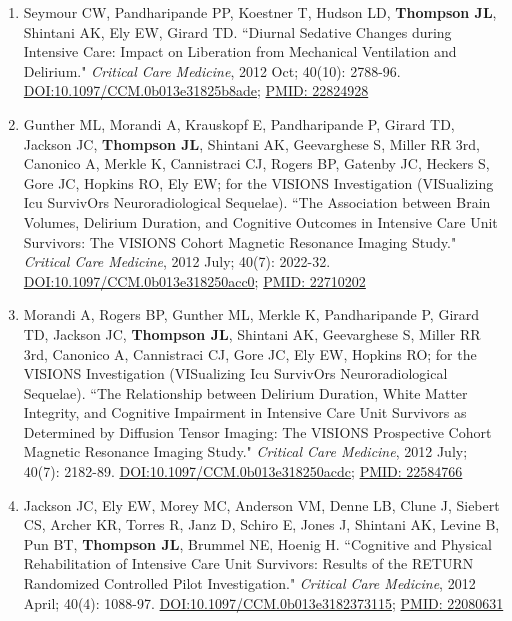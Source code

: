 \documentclass[5pt]{article}
\begin{document}
\begin{enumerate}
\item Seymour CW, Pandharipande PP, Koestner T, Hudson LD, \textbf{Thompson JL}, Shintani AK, Ely EW, Girard TD. ``Diurnal Sedative Changes during Intensive Care: Impact on Liberation from Mechanical Ventilation and Delirium." \emph{Critical Care Medicine}, 2012 Oct; 40(10): 2788-96.\\ \href{https://doi.org/10.1097/CCM.0b013e31825b8ade}{DOI:10.1097/CCM.0b013e31825b8ade}; \href{https://www.ncbi.nlm.nih.gov/pubmed/22824928}{PMID: 22824928}
\item Gunther ML, Morandi A, Krauskopf E, Pandharipande P, Girard TD, Jackson JC, \textbf{Thompson JL}, Shintani AK, Geevarghese S, Miller RR 3rd, Canonico A, Merkle K, Cannistraci CJ, Rogers BP, Gatenby JC, Heckers S, Gore JC, Hopkins RO, Ely EW; for the VISIONS Investigation (VISualizing Icu SurvivOrs Neuroradiological Sequelae). ``The Association between Brain Volumes, Delirium Duration, and Cognitive Outcomes in Intensive Care Unit Survivors: The VISIONS Cohort Magnetic Resonance Imaging Study." \emph{Critical Care Medicine}, 2012 July; 40(7): 2022-32. \href{https://doi.org/10.1097/CCM.0b013e318250acc0}{DOI:10.1097/CCM.0b013e318250acc0}; \href{https://www.ncbi.nlm.nih.gov/pubmed/22710202}{PMID: 22710202}
\item Morandi A, Rogers BP, Gunther ML, Merkle K, Pandharipande P, Girard TD, Jackson JC, \textbf{Thompson JL}, Shintani AK, Geevarghese S, Miller RR 3rd, Canonico A, Cannistraci CJ, Gore JC, Ely EW, Hopkins RO; for the VISIONS Investigation (VISualizing Icu SurvivOrs Neuroradiological Sequelae). ``The Relationship between Delirium Duration, White Matter Integrity, and Cognitive Impairment in Intensive Care Unit Survivors as Determined by Diffusion Tensor Imaging: The VISIONS Prospective Cohort Magnetic Resonance Imaging Study." \emph{Critical Care Medicine}, 2012 July; 40(7): 2182-89. \href{https://doi.org/10.1097/CCM.0b013e318250acdc}{DOI:10.1097/CCM.0b013e318250acdc}; \href{https://www.ncbi.nlm.nih.gov/pubmed/22584766}{PMID: 22584766}
\item Jackson JC, Ely EW, Morey MC, Anderson VM, Denne LB, Clune J, Siebert CS, Archer KR, Torres R, Janz D, Schiro E, Jones J, Shintani AK, Levine B, Pun BT, \textbf{Thompson JL}, Brummel NE, Hoenig H. ``Cognitive and Physical Rehabilitation of Intensive Care Unit Survivors: Results of the RETURN Randomized Controlled Pilot Investigation." \emph{Critical Care Medicine}, 2012 April; 40(4): 1088-97. \href{https://doi.org/10.1097/CCM.0b013e3182373115}{DOI:10.1097/CCM.0b013e3182373115}; \href{https://www.ncbi.nlm.nih.gov/pubmed/22080631}{PMID: 22080631}

\end{enumerate}
\end{document}
